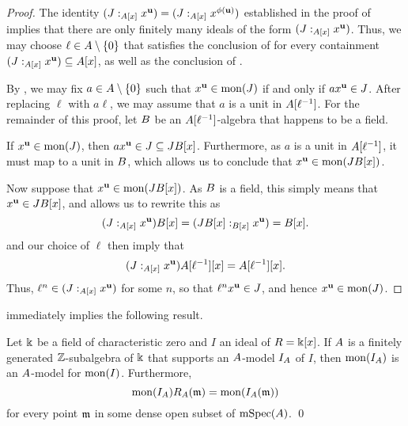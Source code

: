\documentclass{amsart}
\begin{document}
\begin{proof}
   The identity $(J:_{A[x]} x^{\mathbf{u}}) = (J:_{A[x]} x^{\phi(\mathbf{u})})$ established in the proof of  implies that there are only finitely many ideals of the form $(J:_{A[x]} x^{\mathbf{u}})$.
   Thus, we may choose $\ell \in A\setminus \{0\}$ that satisfies the conclusion of  for every containment $(J:_{A[x]} x^{\mathbf{u}}) \subseteq A[x]$, as well as the conclusion of .

   By , we may fix $a \in A \setminus \{0\}$ such that $x^{\mathbf{u}} \in \operatorname{mon}(J)$ if and only if $ax^{\mathbf{u}} \in J$.
   After replacing $\ell$ with $a \ell$, we may assume that $a$ is a unit in $A[\ell^{-1}]$.
   For the remainder of this proof, let $B$ be an $A[\ell^{-1}]$-algebra that happens to be a field.

   If $x^{\mathbf{u}} \in \operatorname{mon}(J)$, then $a x^{\mathbf{u}} \in J \subseteq J B[x]$.
   Furthermore, as $a$ is a unit in $A[\ell^{-1}]$, it must map to a unit in $B$, which allows us to conclude that $x^{\mathbf{u}} \in \operatorname{mon}(J B[x])$.

   Now suppose that $x^{\mathbf{u}} \in \operatorname{mon}(J B[x])$.
   As $B$ is a field, this simply means that $x^{\mathbf{u}} \in J B[x]$, and  allows us to rewrite this as
   \[(J:_{A[x]} x^{\mathbf{u}}) B[x] = (J B[x] :_{B[x]} x^{\mathbf{u}}) = B[x].\]
    and our choice of $\ell$ then imply that \[(J:_{A[x]} x^{\mathbf{u}}) A[\ell^{-1}][x] = A[\ell^{-1}][x].\]
   Thus, $\ell^n \in (J:_{A[x]} x^{\mathbf{u}})$ for some $n$, so that $\ell^n x^{\mathbf{u}} \in J$, and hence $x^{\mathbf{u}} \in \operatorname{mon}(J)$.
\end{proof}

 immediately implies the following result.

\begin{theorem}
   \label{mon-operation-modulo-p: T}
   Let $\Bbbk$ be a field of characteristic zero and $I$ an ideal of $R=\Bbbk[x]$.
   If $A$ is a finitely generated $\mathbb{Z}$-subalgebra of $\Bbbk$ that supports an $A$-model $I_A$ of $I$, then $\operatorname{mon}(I_A)$ is an $A$-model for $\operatorname{mon}(I)$.
   Furthermore,
   \[ \operatorname{mon}(I_A) R_A(\mathfrak{m}) = \operatorname{mon}(I_A(\mathfrak{m})) \]
   for every point $\mathfrak{m}$ in some dense open subset of $\operatorname{mSpec}(A)$. \qed
\end{theorem}
\end{document}

